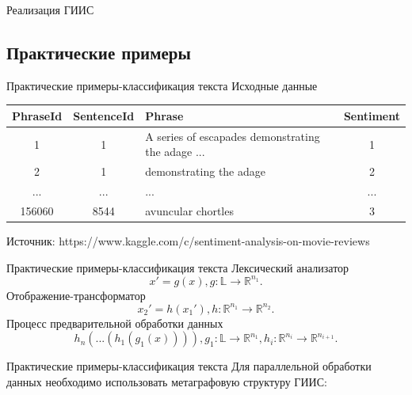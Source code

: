 \documentclass{beamer}
\begin{document}
\begin{darkframes}
\begin{frame}{Реализация ГИИС}
		\end{frame}
		
		\subsection{Практические примеры}

		\begin{frame}{Практические примеры-классификация текста}
		\centering
		Исходные данные
			\begin{tabular}{|c|c|p{3cm}|c|}
			\hline
			PhraseId & SentenceId & Phrase & Sentiment \\ \hline
			1 & 1 & A series of escapades demonstrating the adage ... & 1 \\ \hline
			2 & 1 &demonstrating the adage & 2 \\ \hline
			 ... & ... & ...  & ... \\ \hline
			156060 & 8544 & avuncular chortles & 3 \\\hline  
			\end{tabular}
		Источник: https://www.kaggle.com/c/sentiment-analysis-on-movie-reviews
		\end{frame}

		\begin{frame}{Практические примеры-классификация текста}
		\centering
			Лексический анализатор
			$$x' = g(x), g:\mathbb{L} \to \mathbb{R}^{n_1}.$$
			Отображение-трансформатор
		 	$$x_2' = h(x_1'), h: \mathbb{R}^{n_1} \to \mathbb{R}^{n_2}.$$
		 	Процесс предварительной обработки данных
		 	$$h_n(...(h_1(g_1(x)))), g_1 : \mathbb{L} \to \mathbb{R}^{n_1}, h_i:\mathbb{R}^{n_{i}} \to \mathbb{R}^{n_{i+1}}. $$

		\end{frame}

		\begin{frame}{Практические примеры-классификация текста}
		\centering
			Для параллельной обработки данных необходимо использовать метаграфовую структуру ГИИС:


\end{frame}
\end{darkframes}
\end{document}
